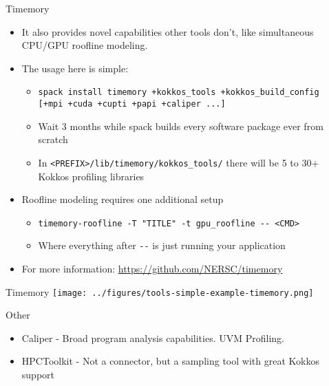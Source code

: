 \begin{frame}[fragile]{Timemory}
  \begin{itemize}
  \item It also provides novel capabilities other tools don't, like simultaneous CPU/GPU
    roofline modeling. 
  \item The usage here is simple:
  \begin{itemize}
  \item \lstinline|spack install timemory +kokkos_tools +kokkos_build_config| \\
     \lstinline|[+mpi +cuda +cupti +papi +caliper ...]|
  \item Wait 3 months while spack builds every software package ever from scratch
  \item In \lstinline|<PREFIX>/lib/timemory/kokkos_tools/| there will be 5 to 30+ 
  Kokkos profiling libraries
  \end{itemize}
  \item Roofline modeling requires one additional setup
  \begin{itemize}
  \item \lstinline|timemory-roofline -T "TITLE" -t gpu_roofline -- <CMD>|
  \item Where everything after \lstinline|--| is just running your application
  \end{itemize}
  \item For more information: \url{https://github.com/NERSC/timemory}
  \end{itemize}
\end{frame}

\begin{frame}[fragile]{Timemory}
  \texttt{[image: ../figures/tools-simple-example-timemory.png]}
\end{frame}


\begin{frame}[fragile]{Other}
  \begin{itemize}
    \item Caliper - Broad program analysis capabilities. UVM Profiling.
    \item HPCToolkit - Not a connector, but a sampling tool with great Kokkos support
  \end{itemize}

\end{frame}


